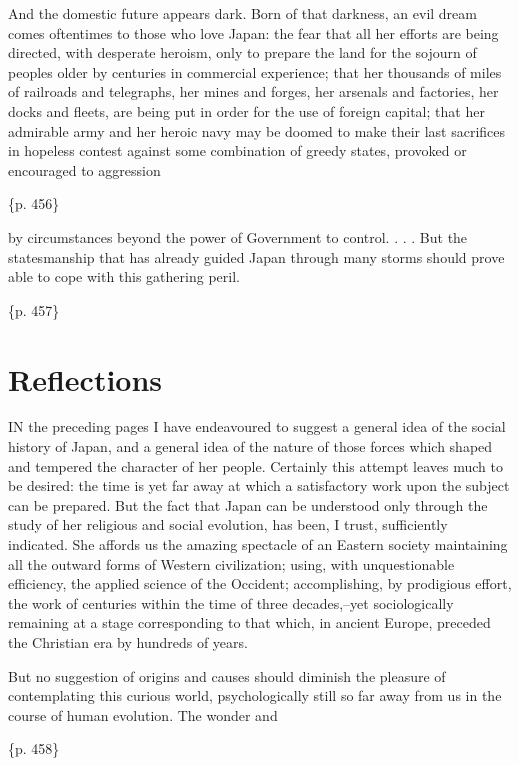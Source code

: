 And the domestic future appears dark. Born of that darkness, an evil dream comes oftentimes to those who love Japan: the fear that all her efforts are being directed, with desperate heroism, only to prepare the land for the sojourn of peoples older by centuries in commercial experience; that her thousands of miles of railroads and telegraphs, her mines and forges, her arsenals and factories, her docks and fleets, are being put in order for the use of foreign capital; that her admirable army and her heroic navy may be doomed to make their last sacrifices in hopeless contest against some combination of greedy states, provoked or encouraged to aggression

\{p. 456\}

by circumstances beyond the power of Government to control. . . . But the statesmanship that has already guided Japan through many storms should prove able to cope with this gathering peril.

\{p. 457\}

\section{Reflections}
\label{sec:org2cffa09}

IN the preceding pages I have endeavoured to suggest a general idea of the social history of Japan, and a general idea of the nature of those forces which shaped and tempered the character of her people. Certainly this attempt leaves much to be desired: the time is yet far away at which a satisfactory work upon the subject can be prepared. But the fact that Japan can be understood only through the study of her religious and social evolution, has been, I trust, sufficiently indicated. She affords us the amazing spectacle of an Eastern society maintaining all the outward forms of Western civilization; using, with unquestionable efficiency, the applied science of the Occident; accomplishing, by prodigious effort, the work of centuries within the time of three decades,--yet sociologically remaining at a stage corresponding to that which, in ancient Europe, preceded the Christian era by hundreds of years.

But no suggestion of origins and causes should diminish the pleasure of contemplating this curious world, psychologically still so far away from us in the course of human evolution. The wonder and

\{p. 458\}

